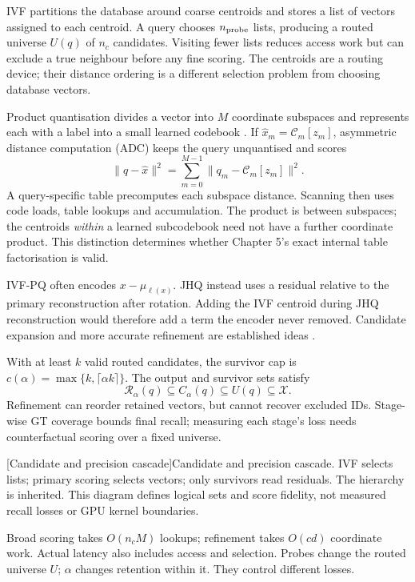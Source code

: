 IVF partitions the database around coarse centroids and stores a list of
vectors assigned to each centroid. A query chooses $n_{\rm probe}$ lists,
producing a routed universe $U(q)$ of $n_c$ candidates. Visiting fewer lists
reduces access work but can exclude a true neighbour before any fine scoring.
The centroids are a routing device; their distance ordering is a different
selection problem from choosing database vectors.

Product quantisation divides a vector into $M$ coordinate subspaces and
represents each with a label into a small learned codebook \cite{pq}.
If $\widehat x_m=\mathcal C_m[z_m]$, asymmetric distance computation (ADC)
keeps the query unquantised and scores
\begin{equation}
 \|q-\widehat x\|^2=\sum_{m=0}^{M-1}\|q_m-\mathcal C_m[z_m]\|^2.
 \label{eq:2-adc}
\end{equation}
A query-specific table precomputes each subspace distance. Scanning then
uses code loads, table lookups and accumulation. The product is between
subspaces; the centroids \emph{within} a learned subcodebook need not have a
further coordinate product. This distinction determines whether Chapter 5's
exact internal table factorisation is valid.

IVF-PQ often encodes $x-\mu_{\ell(x)}$. JHQ instead uses a residual relative to the primary reconstruction after rotation. Adding the IVF centroid during JHQ reconstruction would therefore add a term the encoder never removed. Candidate expansion and more accurate refinement are established ideas \cite{johnson_gpu,faiss_refine}.

With at least $k$ valid routed candidates, the survivor cap is $c(\alpha)=\max\{k,\lceil\alpha k\rceil\}$. The output and survivor sets satisfy
\begin{equation}
 \mathcal R_\alpha(q)\subseteq C_\alpha(q)\subseteq U(q)\subseteq\mathcal X.
 \label{eq:2-cascade}
\end{equation}
Refinement can reorder retained vectors, but cannot recover excluded IDs. Stage-wise GT coverage bounds final recall; measuring each stage's loss needs counterfactual scoring over a fixed universe.

\par\medskip\noindent\begin{minipage}{\linewidth}
\centering\captionsetup{hypcap=false}
\resizebox{\linewidth}{!}{}
[Candidate and precision cascade]{Candidate and precision cascade. IVF selects lists;
primary scoring selects vectors; only survivors read residuals. The hierarchy
is inherited. This diagram defines logical sets and score fidelity,
not measured recall losses or GPU kernel boundaries.}
\label{fig:2-cascade}
\end{minipage}\par\medskip

Broad scoring takes $O(n_cM)$ lookups; refinement takes $O(cd)$ coordinate work. Actual latency also includes access and selection. Probes change the routed universe $U$; $\alpha$ changes retention within it. They control different losses.